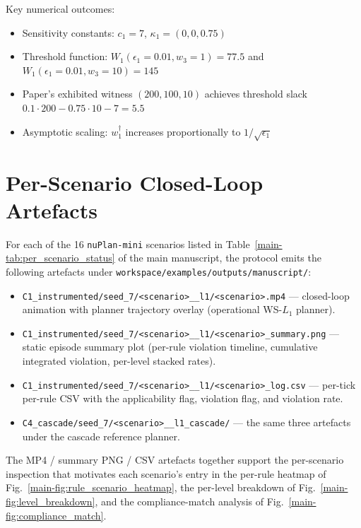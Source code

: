 \documentclass[journal, twocolumn]{IEEEtran}
\begin{document}
Key numerical outcomes:
\begin{itemize}[leftmargin=*,noitemsep]
\item Sensitivity constants: $c_1 = 7$, $\kappa_1 = (0, 0, 0.75)$ \checkmark
\item Threshold function: $W_1(\epsilon_1 = 0.01, w_3 = 1) = 77.5$ and $W_1(\epsilon_1 = 0.01, w_3 = 10) = 145$ \checkmark
\item Paper's exhibited witness $(200, 100, 10)$ achieves threshold slack $0.1 \cdot 200 - 0.75 \cdot 10 - 7 = 5.5$ \checkmark
\item Asymptotic scaling: $w_1^\dagger$ increases proportionally to $1/\sqrt{\epsilon_1}$ \checkmark
\end{itemize}

\section{Per-Scenario Closed-Loop Artefacts}

For each of the 16 \texttt{nuPlan-mini} scenarios listed in Table~\ref{main-tab:per_scenario_status} of the main manuscript, the protocol emits the following artefacts under \texttt{workspace/examples/outputs/manuscript/}:

\begin{itemize}[leftmargin=*,noitemsep]
\item \texttt{C1\_instrumented/seed\_7/<scenario>\_\_l1/<scenario>.mp4} --- closed-loop animation with planner trajectory overlay (operational WS-$L_1$ planner).
\item \texttt{C1\_instrumented/seed\_7/<scenario>\_\_l1/<scenario>\_summary.png} --- static episode summary plot (per-rule violation timeline, cumulative integrated violation, per-level stacked rates).
\item \texttt{C1\_instrumented/seed\_7/<scenario>\_\_l1/<scenario>\_log.csv} --- per-tick per-rule CSV with the applicability flag, violation flag, and violation rate.
\item \texttt{C4\_cascade/seed\_7/<scenario>\_\_l1\_cascade/} --- the same three artefacts under the cascade reference planner.
\end{itemize}

The MP4 / summary PNG / CSV artefacts together support the per-scenario inspection that motivates each scenario's entry in the per-rule heatmap of Fig.~\ref{main-fig:rule_scenario_heatmap}, the per-level breakdown of Fig.~\ref{main-fig:level_breakdown}, and the compliance-match analysis of Fig.~\ref{main-fig:compliance_match}.
\end{document}
